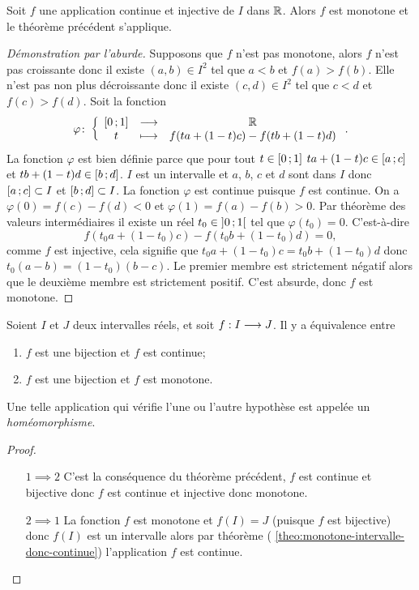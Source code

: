 \begin{theo}
  Soit \(f\) une application continue et injective de \(I\) dans \(\mathbb{R}\). Alors 
  \(f\) est monotone et le théorème précédent s'applique.
\end{theo}
\begin{proof}[Démonstration par l'aburde]
  Supposons que \(f\) n'est pas monotone, alors \(f\) n'est pas croissante donc 
  il existe \((a,b) \in I^2\) tel que \(a < b\) et \(f(a) > f(b)\). Elle n'est 
  pas non plus décroissante donc il existe \((c,d) \in I^2\) tel que \(c < d\) 
  et \(f(c) > f(d)\). Soit la fonction
  \begin{equation}
    \varphi\colon \left\{\begin{array}{ccc} \left[ 0 \, ;  1 \right] & \longrightarrow &\mathbb{R}\\ t & \longmapsto & f(ta+(1-t)c)-f(tb+(1-t)d) \end{array} \right..
  \end{equation}
  La fonction \(\varphi\) est bien définie parce que pour tout \(t \in 
  \left[ 0 \, ;  1 \right]\) \(ta+(1-t)c \in \left[ a \, ;  c \right]\) et \(tb+(1-t)d \in 
  \left[ b \, ;  d \right]\). \(I\) est un intervalle et \(a\), \(b\), \(c\) et \(d\) 
  sont dans \(I\) donc \(\left[ a \, ;  c \right] \subset I\) et 
  \(\left[ b \, ;  d \right] \subset I\). La fonction \(\varphi\) est continue 
  puisque \(f\) est continue. On a \(\varphi(0)=f(c)-f(d) <0\) et 
  \(\varphi(1)=f(a)-f(b) >0\). Par théorème des valeurs intermédiaires il existe 
  un réel \(t_0 \in \left] 0 \, ;  1 \right[\) tel que \(\varphi(t_0)=0\). 
  C'est-à-dire
  \begin{equation}
    f(t_0a+(1-t_0)c)-f(t_0b+(1-t_0)d)=0,
  \end{equation}
  comme \(f\) est injective, cela signifie que \(t_0a+(1-t_0)c=t_0b+(1-t_0)d\) 
  donc \(t_0(a-b)=(1-t_0)(b-c)\). Le premier membre est strictement négatif 
  alors que le deuxième membre est strictement positif. C'est absurde, donc 
  \(f\) est monotone.
\end{proof}
\begin{cor}
  Soient \(I\) et \(J\) deux intervalles réels, et soit \(f:I \longrightarrow J\). 
  Il y a équivalence entre
  \begin{enumerate}
    \item \(f\) est une bijection et \(f\) est continue;
    \item \(f\) est une bijection et \(f\) est monotone.
  \end{enumerate}
  Une telle application qui vérifie l'une ou l'autre hypothèse est appelée un 
  \emph{homéomorphisme}.
\end{cor}
\begin{proof}
  \begin{itemize}
    \item[\(1 \implies 2\)] C'est la conséquence du théorème précédent, \(f\) 
      est continue et bijective donc \(f\) est continue et injective donc 
      monotone.
    \item[\(2 \implies 1\)] La fonction \(f\) est monotone et \(f(I)=J\) 
      (puisque \(f\) est bijective) donc \(f(I)\) est un intervalle alors par 
      théorème (
      \ref{theo:monotone-intervalle-donc-continue}) l'application \(f\) est 
      continue.
  \end{itemize}
\end{proof}

